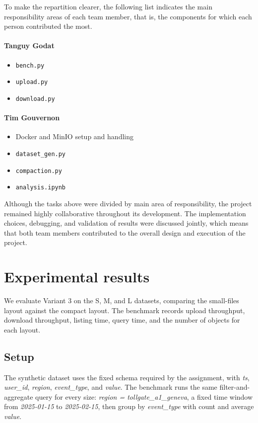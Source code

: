 \documentclass{article}
\begin{document}
To make the repartition clearer, the following list indicates the main responsibility areas of each team member, that is, the components for which each person contributed the most.

\paragraph{Tanguy Godat}
\begin{itemize}
    \item \texttt{bench.py}
    \item \texttt{upload.py}
    \item \texttt{download.py}
\end{itemize}

\paragraph{Tim Gouvernon}
\begin{itemize}
    \item Docker and MinIO setup and handling
    \item \texttt{dataset\_gen.py}
    \item \texttt{compaction.py}
    \item \texttt{analysis.ipynb}
\end{itemize}

Although the tasks above were divided by main area of responsibility, the project remained highly collaborative throughout its development. The implementation choices, debugging, and validation of results were discussed jointly, which means that both team members contributed to the overall design and execution of the project.

\section{Experimental results}

We evaluate Variant 3 on the S, M, and L datasets, comparing the small-files layout against the compact layout. The benchmark records upload throughput, download throughput, listing time, query time, and the number of objects for each layout.

\subsection{Setup}

The synthetic dataset uses the fixed schema required by the assignment, with \textit{ts}, \textit{user\_id}, \textit{region}, \textit{event\_type}, and \textit{value}. The benchmark runs the same filter-and-aggregate query for every size: \textit{region = tollgate\_a1\_geneva}, a fixed time window from \textit{2025-01-15} to \textit{2025-02-15}, then group by \textit{event\_type} with count and average \textit{value}.
\end{document}
